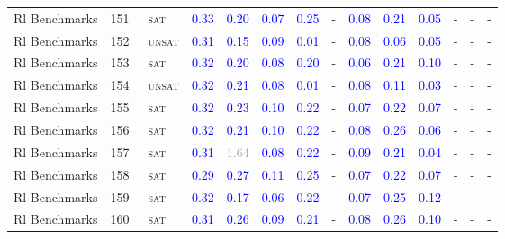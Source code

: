 \begin{center}
{\begin{longtable}{@{}llllllllllllll@{}}
Rl Benchmarks & 151 & ~\textsc{sat} & \textcolor{blue}{0.33} & \textcolor{blue}{0.20} & \textcolor{blue}{0.07} & \textcolor{blue}{0.25} & - & \textcolor{blue}{0.08} & \textcolor{blue}{0.21} & \textcolor{blue}{0.05} & - & - & - \\
Rl Benchmarks & 152 & ~\textsc{unsat} & \textcolor{blue}{0.31} & \textcolor{blue}{0.15} & \textcolor{blue}{0.09} & \textcolor{blue}{0.01} & - & \textcolor{blue}{0.08} & \textcolor{blue}{0.06} & \textcolor{blue}{0.05} & - & - & - \\
Rl Benchmarks & 153 & ~\textsc{sat} & \textcolor{blue}{0.32} & \textcolor{blue}{0.20} & \textcolor{blue}{0.08} & \textcolor{blue}{0.20} & - & \textcolor{blue}{0.06} & \textcolor{blue}{0.21} & \textcolor{blue}{0.10} & - & - & - \\
Rl Benchmarks & 154 & ~\textsc{unsat} & \textcolor{blue}{0.32} & \textcolor{blue}{0.21} & \textcolor{blue}{0.08} & \textcolor{blue}{0.01} & - & \textcolor{blue}{0.08} & \textcolor{blue}{0.11} & \textcolor{blue}{0.03} & - & - & - \\
Rl Benchmarks & 155 & ~\textsc{sat} & \textcolor{blue}{0.32} & \textcolor{blue}{0.23} & \textcolor{blue}{0.10} & \textcolor{blue}{0.22} & - & \textcolor{blue}{0.07} & \textcolor{blue}{0.22} & \textcolor{blue}{0.07} & - & - & - \\
Rl Benchmarks & 156 & ~\textsc{sat} & \textcolor{blue}{0.32} & \textcolor{blue}{0.21} & \textcolor{blue}{0.10} & \textcolor{blue}{0.22} & - & \textcolor{blue}{0.08} & \textcolor{blue}{0.26} & \textcolor{blue}{0.06} & - & - & - \\
Rl Benchmarks & 157 & ~\textsc{sat} & \textcolor{blue}{0.31} & \textcolor{darkgray}{1.64} & \textcolor{blue}{0.08} & \textcolor{blue}{0.22} & - & \textcolor{blue}{0.09} & \textcolor{blue}{0.21} & \textcolor{blue}{0.04} & - & - & - \\
Rl Benchmarks & 158 & ~\textsc{sat} & \textcolor{blue}{0.29} & \textcolor{blue}{0.27} & \textcolor{blue}{0.11} & \textcolor{blue}{0.25} & - & \textcolor{blue}{0.07} & \textcolor{blue}{0.22} & \textcolor{blue}{0.07} & - & - & - \\
Rl Benchmarks & 159 & ~\textsc{sat} & \textcolor{blue}{0.32} & \textcolor{blue}{0.17} & \textcolor{blue}{0.06} & \textcolor{blue}{0.22} & - & \textcolor{blue}{0.07} & \textcolor{blue}{0.25} & \textcolor{blue}{0.12} & - & - & - \\
Rl Benchmarks & 160 & ~\textsc{sat} & \textcolor{blue}{0.31} & \textcolor{blue}{0.26} & \textcolor{blue}{0.09} & \textcolor{blue}{0.21} & - & \textcolor{blue}{0.08} & \textcolor{blue}{0.26} & \textcolor{blue}{0.10} & - & - & - \\

\end{longtable}}
\end{center}
